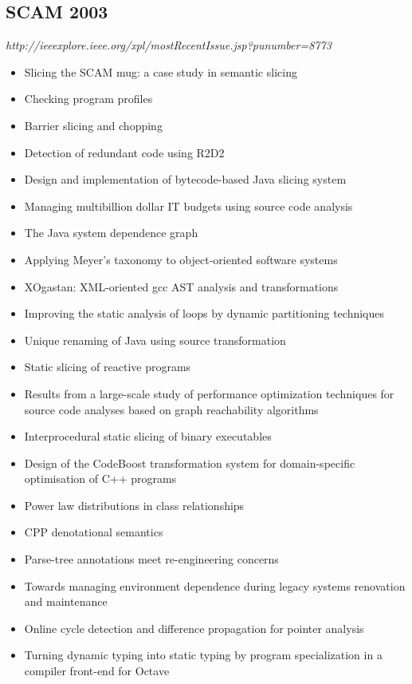 \subsection{SCAM 2003}

{\small \em http://ieeexplore.ieee.org/xpl/mostRecentIssue.jsp?punumber=8773}

{\small
\begin{itemize}[itemsep=-1ex]
  \item Slicing the SCAM mug: a case study in semantic slicing
  \item Checking program profiles {\color{blue} \checkmark}{\color{red} \texttimes}
  \item Barrier slicing and chopping
  \item Detection of redundant code using R2D2
  \item Design and implementation of bytecode-based Java slicing system
  \item Managing multibillion dollar IT budgets using source code analysis
  \item The Java system dependence graph {\color{blue} \checkmark}{\color{red} \texttimes}
  \item Applying Meyer's taxonomy to object-oriented software systems
  \item XOgastan: XML-oriented gcc AST analysis and transformations {\color{blue} \checkmark}{\color{red} \texttimes}
  \item Improving the static analysis of loops by dynamic partitioning techniques
  \item Unique renaming of Java using source transformation {\color{blue} \checkmark}{\color{red} \texttimes}
  \item Static slicing of reactive programs
  \item Results from a large-scale study of performance optimization techniques for source code analyses based on graph reachability algorithms
  \item Interprocedural static slicing of binary executables
  \item Design of the CodeBoost transformation system for domain-specific optimisation of C++ programs {\color{blue} \checkmark}{\color{red} \texttimes}
  \item Power law distributions in class relationships
  \item CPP denotational semantics {\color{blue} \checkmark}{\color{red} \texttimes}
  \item Parse-tree annotations meet re-engineering concerns
  \item Towards managing environment dependence during legacy systems renovation and maintenance
  \item Online cycle detection and difference propagation for pointer analysis {\color{blue} \checkmark}{\color{red} \texttimes}
  \item Turning dynamic typing into static typing by program specialization in a compiler front-end for Octave {\color{blue} \checkmark}{\color{red} \texttimes}
\end{itemize}
}

